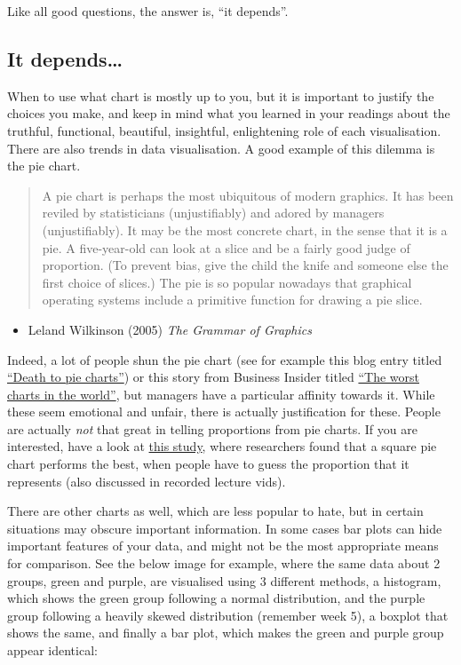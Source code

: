 \documentclass[
]{book}
\providecommand{\tightlist}{%
  \setlength{\itemsep}{0pt}\setlength{\parskip}{0pt}}
\begin{document}
Like all good questions, the answer is, ``it depends''.

\hypertarget{it-depends}{%
\subsection{It depends\ldots{}}\label{it-depends}}

When to use what chart is mostly up to you, but it is important to justify the choices you make, and keep in mind what you learned in your readings about the truthful, functional, beautiful, insightful, enlightening role of each visualisation. There are also trends in data visualisation. A good example of this dilemma is the pie chart.

\begin{quote}
A pie chart is perhaps the most ubiquitous of modern graphics. It has been reviled by statisticians (unjustifiably) and adored by managers (unjustifiably). It may be the most concrete chart, in the sense that it is a pie. A five-year-old can look at a slice and be a fairly good judge of proportion. (To prevent bias, give the child the knife and someone else the first choice of slices.) The pie is so popular nowadays that graphical operating systems include a primitive function for drawing a pie slice.
\end{quote}

\begin{itemize}
\tightlist
\item
  Leland Wilkinson (2005) \emph{The Grammar of Graphics}
\end{itemize}

Indeed, a lot of people shun the pie chart (see for example this blog entry titled \href{http://www.storytellingwithdata.com/blog/2011/07/death-to-pie-charts}{``Death to pie charts''}) or this story from Business Insider titled \href{http://www.businessinsider.com/pie-charts-are-the-worst-2013-6?IR=T}{``The worst charts in the world''}, but managers have a particular affinity towards it. While these seem emotional and unfair, there is actually justification for these. People are actually \emph{not} that great in telling proportions from pie charts. If you are interested, have a look at \href{https://eagereyes.org/blog/2016/a-reanalysis-of-a-study-about-square-pie-charts-from-2009}{this study}, where researchers found that a square pie chart performs the best, when people have to guess the proportion that it represents (also discussed in recorded lecture vids).

There are other charts as well, which are less popular to hate, but in certain situations may obscure important information. In some cases bar plots can hide important features of your data, and might not be the most appropriate means for comparison. See the below image for example, where the same data about 2 groups, green and purple, are visualised using 3 different methods, a histogram, which shows the green group following a normal distribution, and the purple group following a heavily skewed distribution (remember week 5), a boxplot that shows the same, and finally a bar plot, which makes the green and purple group appear identical:
\end{document}
